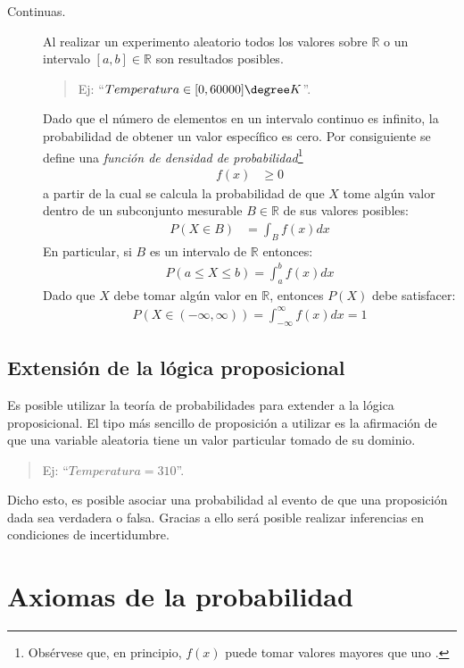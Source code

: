 \begin{description}
 \item [Continuas.] Al realizar un experimento aleatorio todos los valores sobre $\mathbb{R}$ o un intervalo $[a,b] \in \mathbb{R}$ son resultados posibles.
 \begin{quotation}
  Ej: ``$Temperatura \in [0,60000]\degree K$''.
 \end{quotation}
  Dado que el número de elementos en un intervalo continuo es infinito, la probabilidad de obtener un valor específico es cero.  Por consiguiente se define una \emph{función de densidad de probabilidad}\footnote{Obsérvese que, en principio, $f(x)$ puede tomar valores mayores que uno \cite{Barber2012}.}
  \begin{align}
   f(x) &\geq 0
  \end{align}
  a partir de la cual se calcula la probabilidad de que $X$ tome algún valor dentro de un subconjunto mesurable $B \in \mathbb{R}$ de sus valores posibles:
  \begin{align}
   P(X \in B) &= \int_B f(x) dx
  \end{align}
  En particular, si $B$ es un intervalo de $\mathbb{R}$ entonces:
  \begin{align}
   P(a \leq X \leq b) = \int_a^b f(x) dx
  \end{align}
  Dado que $X$ debe tomar algún valor en $\mathbb{R}$, entonces $P(X)$ debe satisfacer:
  \begin{align}
   P(X \in (-\infty,\infty)) = \int_{-\infty}^{\infty} f(x) dx = 1
  \end{align}
\end{description}

\subsection{Extensión de la lógica proposicional}
 
Es posible utilizar la teoría de probabilidades para extender a la lógica proposicional.  El tipo más sencillo de proposición a utilizar es la afirmación de que una variable aleatoria tiene un valor particular tomado de su dominio.
\begin{quotation}
 Ej: ``$Temperatura = 310$''.
\end{quotation}
Dicho esto, es posible asociar una probabilidad al evento de que una proposición dada sea verdadera o falsa.  Gracias a ello será posible realizar inferencias en condiciones de incertidumbre.


\section{Axiomas de la probabilidad}

